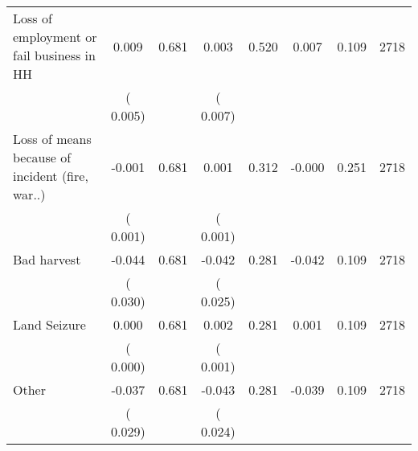 \begin{tabular}{l*{7}{c}}
 Loss of employment or fail business in HH       &              0.009       &        0.681  &              0.003       &        0.520  &              0.007       &              0.109 &  2718 \\ 
                       &       (       0.005)             &                               &       (       0.007)                     &                               &                                               &                                &                      \\ 

 Loss of means because of incident (fire, war..)       &             -0.001       &        0.681  &              0.001       &        0.312  &             -0.000       &              0.251 &  2718 \\ 
                       &       (       0.001)             &                               &       (       0.001)                     &                               &                                               &                                &                      \\ 

 Bad harvest       &             -0.044       &        0.681  &             -0.042       &        0.281  &             -0.042       &              0.109 &  2718 \\ 
                       &       (       0.030)             &                               &       (       0.025)                     &                               &                                               &                                &                      \\ 

 Land Seizure       &              0.000       &        0.681  &              0.002       &        0.281  &              0.001       &              0.109 &  2718 \\ 
                       &       (       0.000)             &                               &       (       0.001)                     &                               &                                               &                                &                      \\ 

 Other       &             -0.037       &        0.681  &             -0.043       &        0.281  &             -0.039       &              0.109 &  2718 \\ 
                       &       (       0.029)             &                               &       (       0.024)                     &                               &                                               &                                &                      \\ 

\hline \end{tabular}